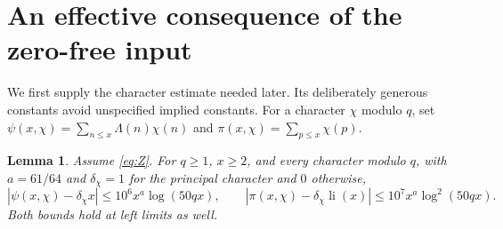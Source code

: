 \documentclass[11pt]{article}
\newtheorem{lemma}[theorem]{Lemma}
\theoremstyle{remark}\newtheorem{remark}[theorem]{Remark}
\newcommand{\li}{\operatorname{li}}
\begin{document}
\section{An effective consequence of the zero-free input}\label{sec:character}
We first supply the character estimate needed later. Its deliberately
generous constants avoid unspecified implied constants.
For a character $\chi$ modulo $q$, set
$\psi(x,\chi)=\sum_{n\le x}\Lambda(n)\chi(n)$ and
$\pi(x,\chi)=\sum_{p\le x}\chi(p)$.
\begin{lemma}\label{lem:character}
Assume \eqref{eq:Z}. For $q\ge1$, $x\ge2$, and every character modulo $q$,
with $a=61/64$ and $\delta_\chi=1$ for the principal character and $0$
otherwise,
\[
|\psi(x,\chi)-\delta_\chi x|\le10^6x^a\log(50qx),\qquad
|\pi(x,\chi)-\delta_\chi\li(x)|\le10^7x^a\log^2(50qx).
\]
Both bounds hold at left limits as well.
\end{lemma}
\end{document}
